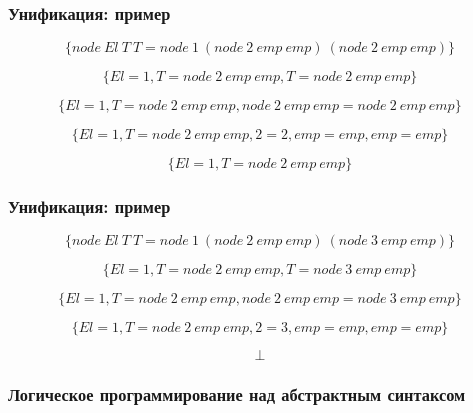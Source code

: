 \documentclass{beamer}
\begin{document}
\begin{frame}[fragile]
  \frametitle{Унификация: пример}
\[
  \{ node \ El \ T \ T = node \ 1 \ (node \ 2 \ emp \ emp) \ (node \ 2 \ emp \ emp) \}
\]

\[
  \{ El = 1, T = node \ 2 \ emp \ emp, T = node \ 2 \ emp \ emp \}
\]

\[
  \{ El = 1, T = node \ 2 \ emp \ emp, node \ 2 \ emp \ emp = node \ 2 \ emp \ emp \}
\]

\[
  \{ El = 1, T = node \ 2 \ emp \ emp, 2 = 2, emp = emp, emp = emp \}
\]

\[
  \{ El = 1, T = node \ 2 \ emp \ emp \}
\]
\end{frame}


\begin{frame}[fragile]
  \frametitle{Унификация: пример}
\[
  \{ node \ El \ T \ T = node \ 1 \ (node \ 2 \ emp \ emp) \ (node \ 3 \ emp \ emp) \}
\]

\[
  \{ El = 1, T = node \ 2 \ emp \ emp, T = node \ 3 \ emp \ emp \}
\]

\[
  \{ El = 1, T = node \ 2 \ emp \ emp, node \ 2 \ emp \ emp = node \ 3 \ emp \ emp \}
\]

\[
  \{ El = 1, T = node \ 2 \ emp \ emp, 2 = 3, emp = emp, emp = emp \}
\]

\[
  \bot
\]
\end{frame}

\begin{frame}[fragile]
  \frametitle{Логическое программирование над абстрактным синтаксом}

  \begin{columns}
    \begin{column}{0.25\textwidth}
    \end{column}

    \begin{column}{0.3\textwidth}
    \end{column}

    \begin{column}{0.45\textwidth}
    \end{column}
  \end{columns}

\end{frame}
\end{document}
